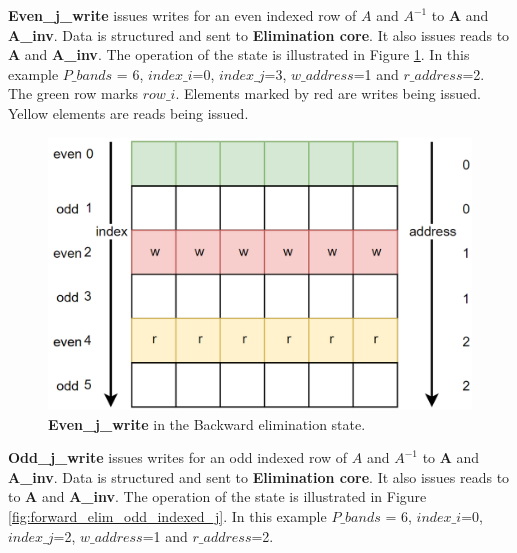 \textbf{Even\_j\_write} issues writes for an even indexed row of $A$ and $A^{-1}$ to \textbf{A} and \textbf{A\_inv}. Data is structured and sent to \textbf{Elimination core}. It also issues reads to \textbf{A} and \textbf{A\_inv}. The operation of the state is illustrated in Figure \ref{fig:forward_elim_even_indexed_j}. In this example $P\_bands$ = 6, $index\_i$=0, $index\_j$=3, $w\_address$=1 and $r\_address$=2. The green row marks $row\_i$. Elements marked by red are writes being issued. Yellow elements are reads being issued. 

\begin{figure}[H]
\centering
   \includegraphics[scale=0.5]{images/inverse_fsms/forward_elim/write_even.PNG}
  \caption{\textbf{Even\_j\_write} in the Backward elimination state. } 
  \label{fig:forward_elim_even_indexed_j}
\end{figure}

\textbf{Odd\_j\_write} issues writes for an odd indexed row of $A$ and $A^{-1}$ to \textbf{A} and \textbf{A\_inv}. Data is structured and sent to \textbf{Elimination core}. It also issues reads to to \textbf{A} and \textbf{A\_inv}. The operation of the state is illustrated in Figure \ref{fig:forward_elim_odd_indexed_j}. In this example $P\_bands$ = 6, $index\_i$=0, $index\_j$=2, $w\_address$=1 and $r\_address$=2. 

